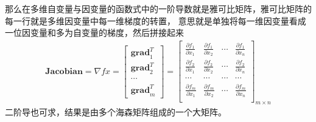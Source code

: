 \documentclass[10pt]{article}
\begin{document}
那么在多维自变量与因变量的函数式中的一阶导数就是雅可比矩阵，雅可比矩阵的每一行就是多维因变量中每一维梯度的转置，
意思就是单独将每一维因变量看成一位因变量和多为自变量的梯度，然后拼接起来
\begin{align} 
    \mathbf{Jacobian}=\nabla f{x}=\left[\begin{array}{c}\mathbf{grad}_1^{T} \\
    \mathbf{grad}_2^{T} \\ \cdots \\ \mathbf{grad}_{m}^{T}\end{array}\right]
    =\left[\begin{array}{cccc}\frac{\partial f_1}{\partial x_1} & \frac{\partial f_1}{\partial x_2} &
    \cdots & \frac{\partial f_1}{\partial x_n} \\
    \frac{\partial f_2}{\partial x_1} & \frac{\partial f_2}{\partial x_2} &
    \cdots & \frac{\partial f_2}{\partial x_n} \\
    \cdots & \cdots & \cdots & \cdots \\
    \frac{\partial f_m}{\partial x_1} & \frac{\partial f_m}{\partial x_2} &
    \cdots & \frac{\partial f_m}{\partial x_n} \\
    \end{array}\right]_{m\times n}
\end{align}
二阶导也可求，结果是由多个海森矩阵组成的一个大矩阵。
\end{document}
